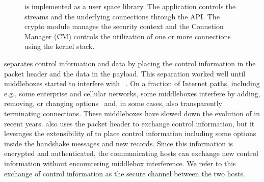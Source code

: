 \begin{figure}[!hbt]
\begin{center}
\end{center}
\vspace{-0.5cm}
\caption{\tcpls is implemented as a user space library. The application controls the streams and the underlying \tcp connections through the API. The crypto module manages the security context and the Connetion Manager (CM) controls the utilization of one or more \tcp connections using the kernel stack.}
 \label{fig:arch}
\end{figure}



\tcp separates control information and data by placing the control information
in the packet header and the data in the payload. This separation worked well
until middleboxes started to interfere with \tcp~\cite{10.1145/1064413.1064418,
  honda2011still}. On a fraction of Internet paths, including e.g., some
enterprise and cellular networks, some middleboxes interfere by adding,
removing, or changing \tcp
options~\cite{wang2011untold,honda2011still,xu2015investigating} and, in some
cases, also transparently terminating \tcp connections. These middleboxes have
slowed down the evolution of \tcp in recent years. \tcpls also uses the packet
header to exchange \tcp control information, but it leverages the extensibility
of  to place control information including some \tcp options inside the
\tls handshake messages and new \tls records. Since this information is
encrypted and authenticated, the communicating hosts can exchange new control
information without encountering middlebox interference. We refer to this
exchange of control information as the secure channel between the two hosts.

